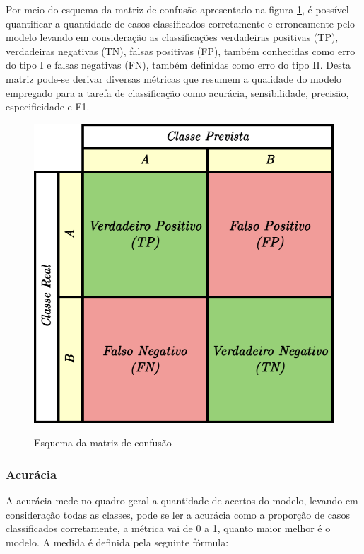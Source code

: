 Por meio do esquema da matriz de confusão apresentado na figura \ref{fig:matriz-de-confusao}, é possível quantificar a quantidade de casos classificados corretamente e erroneamente pelo modelo levando em consideração as classificações verdadeiras positivas (TP), verdadeiras negativas (TN), falsas positivas (FP), também conhecidas como erro do tipo I e falsas negativas (FN), também definidas como erro do tipo II.
Desta matriz pode-se derivar diversas métricas que resumem a qualidade do modelo empregado para a tarefa de classificação como acurácia, sensibilidade, precisão, especificidade e F1.

\begin{figure}[htbp]
	\centering
	\caption{Esquema da matriz de confusão}
		\includegraphics[scale=.25]{imagens/matriz-de-confusao.png}
	\label{fig:matriz-de-confusao}
\end{figure}

\subsubsection{Acurácia}

A acurácia mede no quadro geral a quantidade de acertos do modelo, levando em consideração todas as classes, pode se ler a acurácia como a proporção de casos classificados corretamente, a métrica vai de 0 a 1, quanto maior melhor é o modelo. A medida é definida pela seguinte fórmula:

